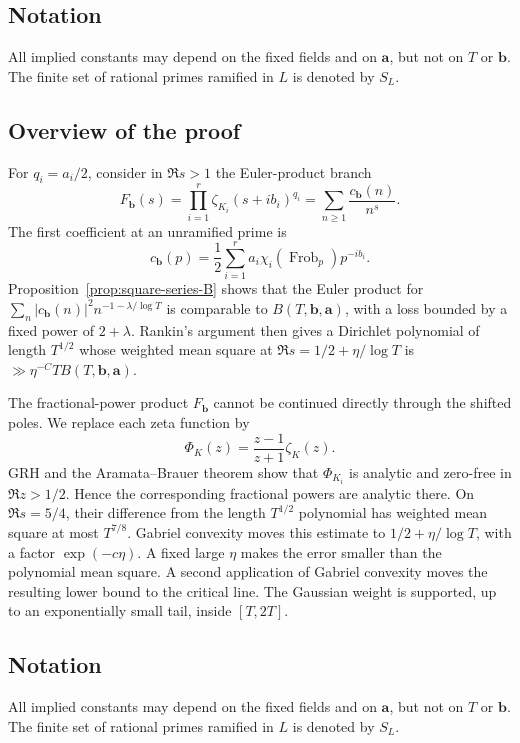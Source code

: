 \documentclass[11pt]{amsart}
\numberwithin{equation}{section}
\theoremstyle{plain}
\renewcommand{\ge}{\geqslant}
\DeclareMathOperator{\Frob}{Frob}
\begin{document}
\subsection*{Notation}

All implied constants may depend on the fixed fields and on $\mathbf a$,
but not on $T$ or $\mathbf b$.  The finite set of rational primes ramified
in $L$ is denoted by $S_L$.


\subsection{Overview of the proof}
For $q_i=a_i/2$, consider in $\Re s>1$ the Euler-product branch
\begin{equation*}
F_{\mathbf b}(s)=
\prod_{i=1}^r\zeta_{K_i}(s+ib_i)^{q_i}
=\sum_{n\ge1}\frac{c_{\mathbf b}(n)}{n^s}.
\end{equation*}
The first coefficient at an unramified prime is
\begin{equation*}
c_{\mathbf b}(p)=
\frac12\sum_{i=1}^r
a_i\chi_i(\Frob_p)p^{-ib_i}.
\end{equation*}
Proposition~\ref{prop:square-series-B} shows that the Euler product for
$\sum_n|c_{\mathbf b}(n)|^2n^{-1-\lambda/\log T}$ is comparable to
$B(T,\mathbf b,\mathbf a)$, with a loss bounded by a fixed power of
$2+\lambda$.  Rankin's argument then gives a
Dirichlet polynomial of length $T^{1/2}$ whose weighted mean square at
$\Re s=1/2+\eta/\log T$ is
$\gg \eta^{-C}TB(T,\mathbf b,\mathbf a)$.

The fractional-power product $F_{\mathbf b}$ cannot be continued directly
through the shifted poles.  We replace each zeta function by
\begin{equation*}
\Phi_K(z)=\frac{z-1}{z+1}\zeta_K(z).
\end{equation*}
GRH and the Aramata--Brauer theorem show that $\Phi_{K_i}$ is analytic and
zero-free in $\Re z>1/2$.  Hence the corresponding fractional powers are
analytic there.  On $\Re s=5/4$, their difference from the length
$T^{1/2}$ polynomial has weighted mean square at most $T^{7/8}$.  Gabriel
convexity moves this estimate to $1/2+\eta/\log T$, with a factor
$\exp(-c\eta)$.  A fixed large $\eta$ makes the error smaller than the
polynomial mean square.  A second application of Gabriel convexity moves
the resulting lower bound to the critical line.  The Gaussian weight is
supported, up to an exponentially small tail, inside $[T,2T]$.

\subsection*{Notation}
All implied constants may depend on the fixed fields and on
$\mathbf a$, but not on $T$ or $\mathbf b$.  The finite set of
rational primes ramified in $L$ is denoted by $S_L$.
\end{document}
